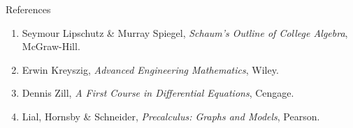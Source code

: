 \documentclass[12pt]{beamer}
\begin{document}
\begin{frame}{References}

\begin{enumerate}
    \item Seymour Lipschutz \& Murray Spiegel, \textit{Schaum’s Outline of College Algebra}, McGraw-Hill.
    \item Erwin Kreyszig, \textit{Advanced Engineering Mathematics}, Wiley.
    \item Dennis Zill, \textit{A First Course in Differential Equations}, Cengage.
    \item Lial, Hornsby \& Schneider, \textit{Precalculus: Graphs and Models}, Pearson.
\end{enumerate}

\end{frame}

\end{document}
